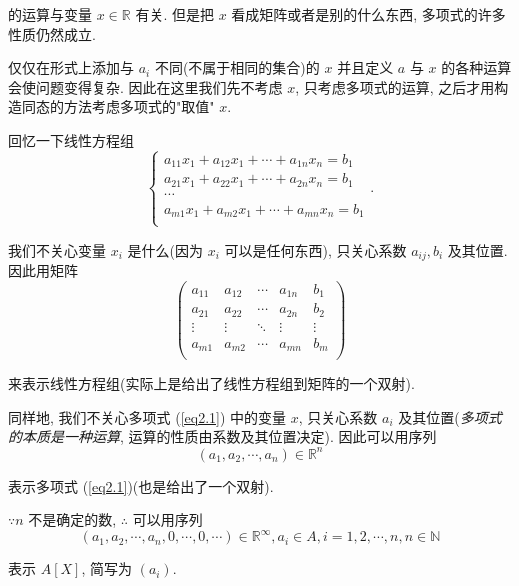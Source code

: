 \documentclass[UTF8]{ctexart}
\begin{document}
的运算与变量 $x\in\mathbb{R}$ 有关. 但是把 $x$ 看成矩阵或者是别的什么东西, 多项式的许多性质仍然成立.

仅仅在形式上添加与 $a_i$ 不同(不属于相同的集合)的 $x$ 并且定义 $a$ 与 $x$ 的各种运算会使问题变得复杂. 因此在这里我们先不考虑 $x$, 只考虑多项式的运算, 之后才用构造同态的方法考虑多项式的"取值" $x$.

回忆一下线性方程组
\[\begin{cases}
    a_{11}x_1+a_{12}x_1+\cdots+a_{1n}x_n=b_1 \\
    a_{21}x_1+a_{22}x_1+\cdots+a_{2n}x_n=b_1 \\
    \cdots \\
    a_{m1}x_1+a_{m2}x_1+\cdots+a_{mn}x_n=b_1 \\
\end{cases}.\]

我们不关心变量 $x_i$ 是什么(因为 $x_i$ 可以是任何东西), 只关心系数 $a_{ij},b_i$ 及其位置. 因此用矩阵
\[\begin{pmatrix}
    a_{11} & a_{12} & \cdots & a_{1n} & b_{1} \\
    a_{21} & a_{22} & \cdots & a_{2n} & b_{2} \\
    \vdots & \vdots & \ddots & \vdots & \vdots \\
    a_{m1} & a_{m2} & \cdots & a_{mn} & b_{m} \\
\end{pmatrix}\]

来表示线性方程组(实际上是给出了线性方程组到矩阵的一个双射).

同样地, 我们不关心多项式 (\ref{eq2.1}) 中的变量 $x$, 只关心系数 $a_{i}$ 及其位置(\emph{多项式的本质是一种运算}, 运算的性质由系数及其位置决定). 因此可以用序列
\[(a_1,a_2,\cdots,a_n)\in\mathbb{R}^n\]

表示多项式 (\ref{eq2.1})(也是给出了一个双射).

$\because n$ 不是确定的数, $\therefore$ 可以用序列
\[(a_1,a_2,\cdots,a_n,0,\cdots,0,\cdots)\in\mathbb{R}^\infty,a_i\in A,i=1,2,\cdots,n,n\in\mathbb{N}\]

表示 $A[X]$, 简写为 $(a_i)$.
\end{document}

